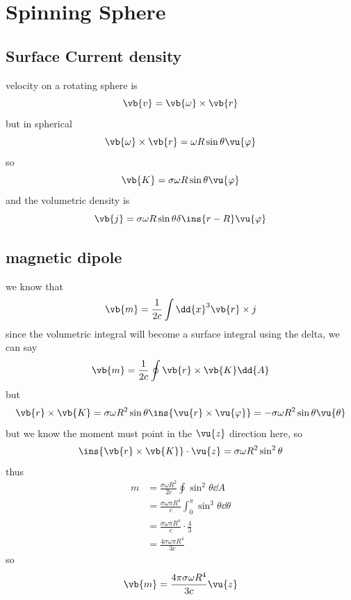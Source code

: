 \clearpage
\section{Spinning Sphere}
\subsection{Surface Current density}
velocity on a rotating sphere is 
\begin{equation}
  \vb{v} = \vb{\omega}\times\vb{r}
\end{equation}
but in spherical
\begin{equation}
  \vb{\omega}\times\vb{r}=\omega R \sin\theta\vu{\varphi}
\end{equation}
so 
\begin{equation}
  \vb{K} = \sigma\omega R \sin\theta\vu{\varphi}
\end{equation}
and the volumetric density is 
\begin{equation}
  \vb{j} = \sigma\omega R \sin\theta\delta\ins{r-R}\vu{\varphi}
\end{equation}
\subsection{magnetic dipole}
we know that 
\begin{equation}
  \vb{m} = \frac{1}{2c}\int \dd{x}^3 \vb{r}\times j 
\end{equation}
since the volumetric integral will become a surface integral using the delta, we can say 
\begin{equation}
  \vb{m} = \frac{1}{2c}\oint \vb{r}\times \vb{K}\dd{A}
\end{equation}
but 
\begin{equation}
  \vb{r}\times\vb{K}=\sigma\omega R^2\sin\theta \ins{\vu{r}\times\vu{\varphi}}=-\sigma\omega R^2\sin\theta\vu{\theta}
\end{equation}
but we know the moment must point in the \(\vu{z}\) direction here, so 
\begin{equation}
  \ins{\vb{r}\times\vb{K}}\cdot\vu{z}=\sigma\omega R^2\sin^2\theta
\end{equation}
thus 
\begin{align}
  m&=\frac{\sigma\omega R^2}{2c}\oint\sin^2\theta\dd{A}\\
  &= \frac{\sigma\omega \pi R^4}{c}\int_{0}^{\pi}\sin^3\theta\dd{\theta}\\
  &= \frac{\sigma\omega \pi R^4}{c}\cdot\frac{4}{3}\\
  &= \frac{4\sigma\omega \pi R^4}{3c}
\end{align}
so 
\begin{equation}
  \vb{m} = \frac{4\pi\sigma\omega R^4}{3c}\vu{z}
\end{equation}
